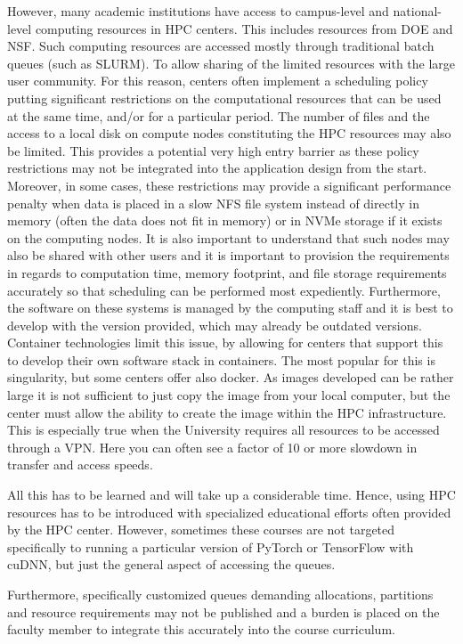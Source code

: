 \documentclass[utf8]{FrontiersinVancouver} %
\begin{document}
However, many academic institutions have access to campus-level and
national-level computing resources in HPC centers.  This includes
resources from DOE and NSF. Such computing resources are accessed
mostly through traditional batch queues (such as SLURM).  To allow
sharing of the limited resources with the large user community. For
this reason, centers often implement a scheduling policy putting
significant restrictions on the computational resources that can be
used at the same time, and/or for a particular period. The number of
files and the access to a local disk on compute nodes constituting the
HPC resources may also be limited.  This provides a potential very high
entry barrier as these policy restrictions may not be integrated into
the application design from the start.  Moreover, in some cases, these
restrictions may provide a significant performance penalty when data
is placed in a slow NFS file system instead of directly in memory
(often the data does not fit in memory) or in NVMe storage if it
exists on the computing nodes.  It is also important to understand
that such nodes may also be shared with other users and it is
important to provision the requirements in regards to computation
time, memory footprint, and file storage requirements accurately so
that scheduling can be performed most expediently.  Furthermore, the
software on these systems is managed by the computing staff and it is
best to develop with the version provided, which may already be
outdated versions.  Container technologies limit this issue, by
allowing for centers that support this to develop their own software
stack in containers. The most popular for this is singularity, but
some centers offer also docker.  As images developed can be rather
large it is not sufficient to just copy the image from your local
computer, but the center must allow the ability to create the image
within the HPC infrastructure. This is especially true when the
University requires all resources to be accessed through a VPN. Here
you can often see a factor of 10 or more slowdown in transfer and
access speeds.

All this has to be learned and will take up a considerable
time. Hence, using HPC resources has to be introduced with specialized
educational efforts often provided by the HPC center. However,
sometimes these courses are not targeted specifically to running a
particular version of PyTorch or TensorFlow with cuDNN, but just the
general aspect of accessing the queues.

Furthermore, specifically customized queues demanding allocations,
partitions and resource requirements may not be published and a burden
is placed on the faculty member to integrate this accurately into the
course curriculum.
\end{document}
